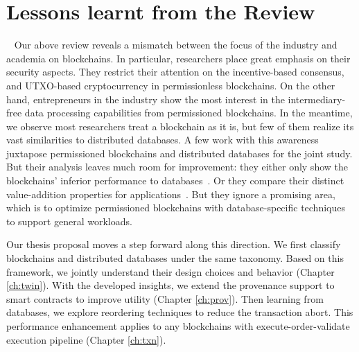 \section{Lessons learnt from the Review} 
Our above review reveals a mismatch between the focus of the industry and academia on blockchains. 
In particular, researchers place great emphasis on their security aspects. They restrict their attention on the incentive-based consensus, and UTXO-based cryptocurrency in permissionless blockchains. On the other hand, entrepreneurs in the industry show the most interest in the intermediary-free data processing capabilities from permissioned blockchains. 
In the meantime, we observe most researchers treat a blockchain as it is, but few of them realize its vast similarities to distributed databases. A few work with this awareness juxtapose permissioned blockchains and distributed databases for the joint study. 
But their analysis leaves much room for improvement: they either only show the blockchains' inferior performance to databases~\cite{dinh2017blockbench,chen2018comparative}. Or they compare their distinct value-addition properties for applications~\cite{chowdhury2018blockchain,wust2018you,yaga2019blockchain}. 
But they ignore a promising area, which is to optimize permissioned blockchains with database-specific techniques to support general workloads. 

Our thesis proposal moves a step forward along this direction. 
We first classify blockchains and distributed databases under the same taxonomy.
Based on this framework, we jointly understand their design choices and behavior (Chapter \ref{ch:twin}). 
With the developed insights, we extend the provenance support to smart contracts to improve utility (Chapter \ref{ch:prov}). Then learning from databases, we explore reordering techniques to reduce the transaction abort. 
This performance enhancement applies to any blockchains with execute-order-validate execution pipeline (Chapter \ref{ch:txn}).  

